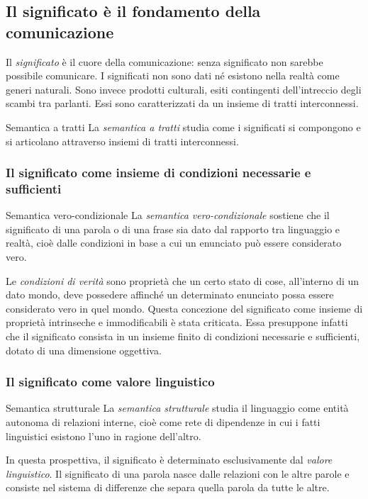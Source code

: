 \documentclass[a4paper]{article}
\begin{document}
\subsection{Il significato è il fondamento della comunicazione}
Il \emph{significato} è il cuore della comunicazione: senza significato non sarebbe possibile comunicare.
I significati non sono dati né esistono nella realtà come generi naturali. Sono invece prodotti culturali, esiti contingenti dell'intreccio degli scambi tra parlanti. Essi sono caratterizzati da un insieme di tratti interconnessi.
\begin{snippetdefinition}{Semantica a tratti}
    La \emph{semantica a tratti} studia come i significati si compongono e si articolano attraverso insiemi di tratti interconnessi.
\end{snippetdefinition}
\subsubsection{Il significato come insieme di condizioni necessarie e sufficienti}
\begin{snippetdefinition}{Semantica vero-condizionale}
    La \emph{semantica vero-condizionale} sostiene che il significato di una parola o di una frase sia dato dal rapporto tra linguaggio e realtà, cioè dalle condizioni in base a cui un enunciato può essere considerato vero.
\end{snippetdefinition}
Le \emph{condizioni di verità} sono proprietà che un certo stato di cose, all'interno di un dato mondo, deve possedere affinché un determinato enunciato possa essere considerato vero in quel mondo.
Questa concezione del significato come insieme di proprietà intrinseche e immodificabili è stata criticata. Essa presuppone infatti che il significato consista in un insieme finito di condizioni necessarie e sufficienti, dotato di una dimensione oggettiva.
\subsubsection{Il significato come valore linguistico}
\begin{snippetdefinition}{Semantica strutturale}
    La \emph{semantica strutturale} studia il linguaggio come entità autonoma di relazioni interne, cioè come rete di dipendenze in cui i fatti linguistici esistono l'uno in ragione dell'altro.
\end{snippetdefinition}
In questa prospettiva, il significato è determinato esclusivamente dal \emph{valore linguistico}. Il significato di una parola nasce dalle relazioni con le altre parole e consiste nel sistema di differenze che separa quella parola da tutte le altre.
\end{document}
